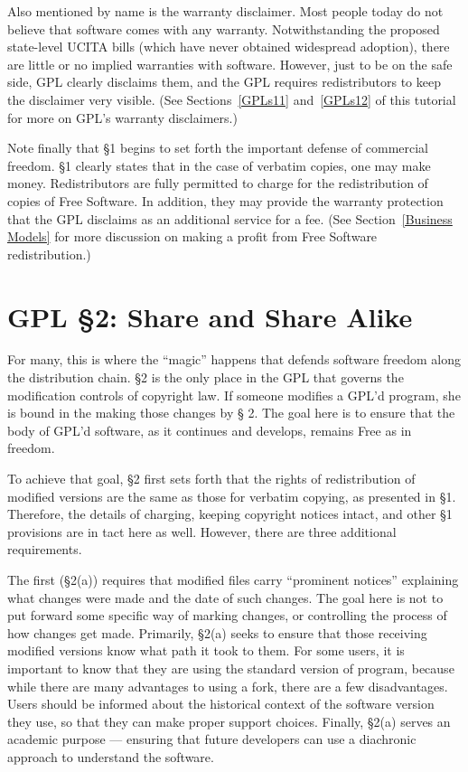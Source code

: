 \documentclass[12pt]{report}
\begin{document}
Also mentioned by name is the warranty disclaimer.  Most people today do
not believe that software comes with any warranty.  Notwithstanding the
proposed state-level UCITA bills (which have never obtained widespread
adoption), there are little or no implied warranties with software.
However, just to be on the safe side, GPL clearly disclaims them, and the
GPL requires redistributors to keep the disclaimer very visible.  (See
Sections~\ref{GPLs11} and~\ref{GPLs12} of this tutorial for more on GPL's
warranty disclaimers.)

Note finally that \S 1 begins to set forth the important defense of
commercial freedom.  \S 1 clearly states that in the case of verbatim
copies, one may make money.  Redistributors are fully permitted to charge
for the redistribution of copies of Free Software.  In addition, they may
provide the warranty protection that the GPL disclaims as an additional
service for a fee.  (See Section~\ref{Business Models} for more discussion
on making a profit from Free Software redistribution.)

\section{GPL \S 2: Share and Share Alike}

For many, this is where the ``magic'' happens that defends software
freedom along the distribution chain.  \S 2 is the only place in the GPL
that governs the modification controls of copyright law.  If someone
modifies a GPL'd program, she is bound in the making those changes by \S
2.  The goal here is to ensure that the body of GPL'd software, as it
continues and develops, remains Free as in freedom.

To achieve that goal, \S 2 first sets forth that the rights of
redistribution of modified versions are the same as those for verbatim
copying, as presented in \S 1.  Therefore, the details of charging,
keeping copyright notices intact, and other \S 1 provisions are in tact
here as well.  However, there are three additional requirements.

The first (\S 2(a)) requires that modified files carry ``prominent
notices'' explaining what changes were made and the date of such changes.
The goal here is not to put forward some specific way of marking changes,
or controlling the process of how changes get made.  Primarily, \S 2(a)
seeks to ensure that those receiving modified versions know what path it
took to them.  For some users, it is important to know that they are using
the standard version of program, because while there are many advantages
to using a fork, there are a few disadvantages.  Users should be informed
about the historical context of the software version they use, so that
they can make proper support choices.  Finally, \S 2(a) serves an academic
purpose --- ensuring that future developers can use a diachronic approach
to understand the software.
\end{document}
